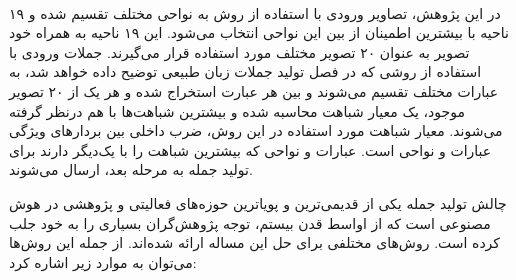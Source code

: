 \begin{enumerate}
\\
در این پژوهش، تصاویر ورودی با استفاده از روش  به نواحی مختلف تقسیم شده و ۱۹ ناحیه با بیشترین اطمینان از بین این نواحی انتخاب می‌شود. این ۱۹ ناحیه به همراه خود تصویر به عنوان ۲۰ تصویر مختلف مورد استفاده قرار می‌گیرند. جملات ورودی با استفاده از روشی که در فصل تولید جملات زبان طبیعی توضیح داده خواهد شد، به عبارات مختلف تقسیم می‌شوند و بین هر عبارت استخراج شده و هر یک از ۲۰ تصویر موجود، یک معیار شباهت محاسبه شده و بیشترین شباهت‌ها با هم درنظر گرفته می‌شوند. معیار شباهت مورد استفاده در این روش، ضرب داخلی بین بردارهای ویژگی عبارات و نواحی است. عبارات و نواحی که بیشترین شباهت را با یک‌دیگر دارند برای تولید جمله به مرحله بعد، ارسال می‌شوند.
\end{enumerate}


چالش تولید جمله یکی از قدیمی‌ترین و پویاترین حوزه‌های فعالیتی و پژوهشی در هوش مصنوعی است که از اواسط قدن بیستم، توجه پژوهش‌گران بسیاری را به خود جلب کرده است. روش‌های مختلفی برای حل این مساله ارائه شده‌اند. از جمله این روش‌ها می‌توان به موارد زیر اشاره کرد:

